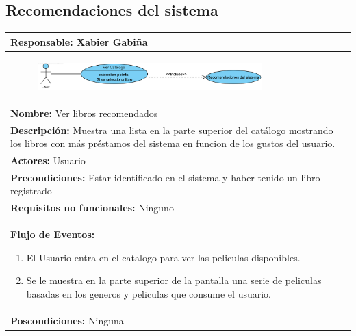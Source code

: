 \documentclass{report}
\begin{document}
        \subsection{Recomendaciones del sistema}
            \begin{center}
                \begin{longtable}{|p{\linewidth}|}
                    \hline
                    \textbf{Responsable:} Xabier Gabiña\\
                    \hline
                    \begin{figure}[H]
                        \centering
                        \includegraphics[width=0.8\textwidth]{./img/casos_uso/RecomendacionesLibros.png}
                    \end{figure}\\
                    \hline
                    \textbf{Nombre:} Ver libros recomendados\\
                    \hline
                    \textbf{Descripción:} Muestra una lista en la parte superior del catálogo mostrando los libros con más préstamos del sistema en funcion de los gustos del usuario.\\
                    \hline
                    \textbf{Actores:} Usuario\\
                    \hline
                    \textbf{Precondiciones:} Estar identificado en el sistema y haber tenido un libro registrado\\
                    \hline
                    \textbf{Requisitos no funcionales:} Ninguno\\
                    \hline
                    \textbf{Flujo de Eventos:}
                    \begin{enumerate}
                        \item El Usuario entra en el catalogo para ver las peliculas disponibles.
                        \item Se le muestra en la parte superior de la pantalla una serie de peliculas basadas en los generos y peliculas que consume el usuario.
                    \end{enumerate}\\
                    \hline
                    \textbf{Poscondiciones:} Ninguna\\
                    \hline

\end{longtable}
\end{center}
\end{document}
